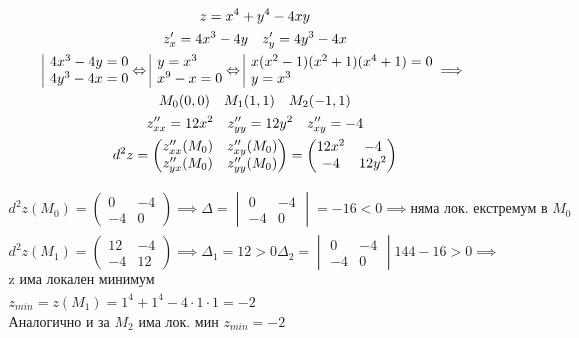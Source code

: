 \documentclass[a4paper,fleqn,12pt]{article}
\theoremstyle{definition}
\begin{document}
\begin{gather*}
z = x^4 + y^4 - 4xy\\
z'_x = 4x^3 - 4y \quad z'_y =4y^3 - 4x\\
\begin{array}{|l@{}}
4x^3 - 4y = 0\\
4y^3 - 4x = 0
\end{array} \Leftrightarrow
\begin{array}{|l@{}}
y = x^3\\
x^9 - x = 0
\end{array} \Leftrightarrow
\begin{array}{|l@{}}
x(x^2-1)(x^2+1)(x^4+1) = 0\\
y = x^3
\end{array} \implies\\
M_0(0,0) \quad M_1(1,1) \quad M_2(-1,1) \\
z''_{xx} = 12x^2 \quad z''_{yy} = 12y^2 \quad z''_{xy} = -4 \\
d^2z = 
\begin{pmatrix}
z''_{xx}(M_0) & z''_{xy}(M_0)\\
z''_{yx}(M_0) & z''_{yy}(M_0)
\end{pmatrix} = 
\begin{pmatrix}
12x^2 & -4\\
-4 & 12y^2
\end{pmatrix} 
\end{gather*}

\begin{gather*}
d^2z(M_0) = 
\begin{pmatrix}
0 & -4\\
-4 & 0
\end{pmatrix} \implies \Delta = 
\begin{vmatrix}
0 & -4\\
-4 & 0
\end{vmatrix} = -16 < 0 \implies \text{няма лок. екстремум в } M_0 \\
d^2z(M_1) = 
\begin{pmatrix}
12 & -4\\
-4 & 12
\end{pmatrix} \implies \Delta_1 = 12 > 0 \Delta_2 = 
\begin{vmatrix}
0 & -4\\
-4 & 0
\end{vmatrix} 144 - 16 > 0 \implies \\
\text{z има локален минимум}\\
z_{min} = z(M_1) = 1^4 + 1^4 - 4 \cdot 1 \cdot 1 = -2\\
\text{Аналогично и за $M_2$ има лок. мин $z_{min} = -2$}
\end{gather*} 
\end{document}
